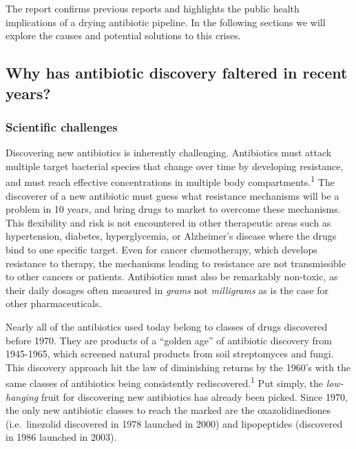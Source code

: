 \documentclass[
  11pt,
  paper=a4,
  ,captions=tableheading
]{scrartcl}
\begin{document}
The report confirms previous reports and highlights the public health
implications of a drying antibiotic pipeline. In the following sections
we will explore the causes and potential solutions to this crises.

\hypertarget{why-has-antibiotic-discovery-faltered-in-recent-years}{%
\subsection*{Why has antibiotic discovery faltered in recent
years?}\label{why-has-antibiotic-discovery-faltered-in-recent-years}}

\hypertarget{scientific-challenges}{%
\subsubsection*{Scientific challenges}\label{scientific-challenges}}

Discovering new antibiotics is inherently challenging. Antibiotics must
attack multiple target bacterial species that change over time by
developing resistance, and must reach effective concentrations in
multiple body compartments.\textsuperscript{1} The discoverer of a new
antibiotic must guess what resistance mechanisms will be a problem in 10
years, and bring drugs to market to overcome these mechanisms. This
flexibility and risk is not encountered in other therapeutic areas such
as hypertension, diabetes, hyperglycemia, or Alzheimer's disease where
the drugs bind to one specific target. Even for cancer chemotherapy,
which develops resistance to therapy, the mechanisms leading to
resistance are not transmissible to other cancers or patients.
Antibiotics must also be remarkably non-toxic, as their daily dosages
often measured in \emph{grams} not \emph{milligrams} as is the case for
other pharmaceuticals.

Nearly all of the antibiotics used today belong to classes of drugs
discovered before 1970. They are products of a ``golden age'' of
antibiotic discovery from 1945-1965, which screened natural products
from soil streptomyces and fungi. This discovery approach hit the law of
diminishing returns by the 1960's with the same classes of antibiotics
being consistently rediscovered.\textsuperscript{1} Put simply, the
\emph{low-hanging} fruit for discovering new antibiotics has already
been picked. Since 1970, the only new antibiotic classes to reach the
marked are the oxazolidinediones (i.e.~linezolid discovered in 1978
launched in 2000) and lipopeptides (discovered in 1986 launched in
2003).
\end{document}
